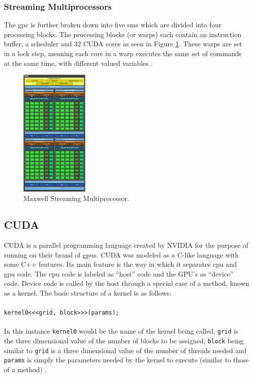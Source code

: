 \subsubsection{Streaming Multiprocessors}\label{gpu:ssec:smm}
The \gls{gpc} is further broken down into five \gls{sm}s which are divided into four processing blocks. The processing blocks (or warps) each contain an instruction buffer, a scheduler and 32 CUDA cores as seen in Figure \ref{gpu:img:smm}. These warps are set in a lock step, meaning each core in a warp executes the same set of commands at the same time, with different valued variables \citep{CUDA}.
%
\begin{figure}[H]
\centering
 \includegraphics[width=0.3\textwidth]{Images/GM107SMM.png}
 \caption[]{Maxwell Streaming Multiprocessor.\footnotemark}
 \label{gpu:img:smm}
\end{figure}
\subsection{CUDA}\label{gpu:sec:cuda}
CUDA is a parallel programming language created by NVIDIA for the purpose of running on their brand of \gls{gpu}s. CUDA was modeled as a C-like language with some C++ features. Its main feature is the way in which it separates \gls{cpu} and \gls{gpu} code. The \gls{cpu} code is labeled as ``host'' code and the GPU's as ``device'' code. Device code is called by the host through a special case of a method, known as a kernel. The basic structure of a kernel is as follows: 
\\
\\
\texttt{kernel0<<<grid, block>>>(params);}
\\
\\
In this instance \texttt{kernel0} would be the name of the kernel being called, \texttt{grid} is the three dimensional value of the number of blocks to be assigned, \texttt{block} being similar to \texttt{grid} is a three dimensional value of the number of threads needed and \texttt{params} is simply the parameters needed by the kernel to execute (similar to those of a method) \citep{CUDA}.
%
